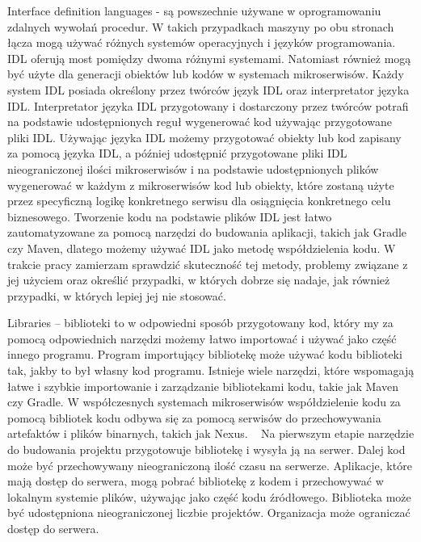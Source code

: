 \documentclass[runningheads,12pt]{llncs} \usepackage{graphicx} \usepackage{todonotes} \usepackage{fancyhdr} \usepackage{lipsum} \usepackage[T1]{fontenc} \usepackage[provide=*,english,polish]{babel}
\begin{document}
Interface definition languages - są powszechnie używane w oprogramowaniu zdalnych wywołań procedur. W takich przypadkach maszyny po obu stronach łącza mogą używać różnych systemów operacyjnych i języków programowania. IDL oferują most pomiędzy dwoma różnymi systemami. Natomiast również mogą być użyte dla generacji obiektów lub kodów w systemach mikroserwisów. Każdy system IDL posiada określony przez twórców język IDL oraz interpretator języka IDL. Interpretator języka IDL przygotowany i dostarczony przez twórców potrafi na podstawie udostępnionych reguł wygenerować kod używając przygotowane pliki IDL. Używając języka IDL możemy przygotować obiekty lub kod zapisany za pomocą języka IDL, a później udostępnić przygotowane pliki IDL nieograniczonej ilości mikroserwisów i na podstawie udostępnionych plików wygenerować w każdym z mikroserwisów kod lub obiekty, które zostaną użyte przez specyficzną logikę konkretnego serwisu dla osiągnięcia konkretnego celu biznesowego. Tworzenie kodu na podstawie plików IDL jest łatwo zautomatyzowane za pomocą narzędzi do budowania aplikacji, takich jak Gradle czy Maven, dlatego możemy używać IDL jako metodę współdzielenia kodu. W trakcie pracy zamierzam sprawdzić skuteczność tej metody, problemy związane z jej użyciem oraz określić przypadki, w których dobrze się nadaje, jak również przypadki, w których lepiej jej nie stosować.

Libraries – biblioteki to w odpowiedni sposób przygotowany kod, który my za pomocą odpowiednich narzędzi możemy łatwo importować i używać jako część innego programu. Program importujący bibliotekę może używać kodu biblioteki tak, jakby to był własny kod programu. Istnieje wiele narzędzi, które wspomagają łatwe i szybkie importowanie i zarządzanie bibliotekami kodu, takie jak Maven czy Gradle. W współczesnych systemach mikroserwisów współdzielenie kodu za pomocą bibliotek kodu odbywa się za pomocą serwisów do przechowywania artefaktów i plików binarnych, takich jak Nexus. ~\cite[5]{labouardy2021pipeline} Na pierwszym etapie narzędzie do budowania projektu przygotowuje bibliotekę i wysyła ją na serwer. Dalej kod może być przechowywany nieograniczoną ilość czasu na serwerze. Aplikacje, które mają dostęp do serwera, mogą pobrać bibliotekę z kodem i przechowywać w lokalnym systemie plików, używając jako część kodu źródłowego. Biblioteka może być udostępniona nieograniczonej liczbie projektów. Organizacja może ograniczać dostęp do serwera.
\end{document}
